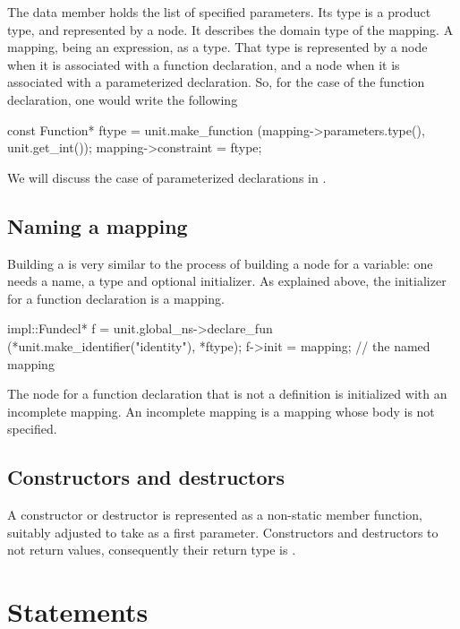 \documentclass[a4paper,12pt]{article}
\begin{document}
The data member 
holds the list of specified parameters.  Its type is a product type, and
represented by a  node.  It describes the domain type of
the mapping.  A mapping, being an expression, as a type.  That type is
represented by a  node when it is associated with a
function declaration, and a  node when it is associated
with a parameterized declaration.  So, for the case of the 
function declaration, one would write the following
\begin{Program}
const Function* ftype = unit.make_function
    (mapping->parameters.type(), unit.get_int());
mapping->constraint = ftype;  
\end{Program}

We will discuss the case of parameterized declarations in
. 

\subsection{Naming a mapping}
\label{sec:fun-decl:naming}

Building a  is very similar to the process of
building a node for a variable: one needs a name, a type and optional
initializer.  As explained above, the initializer for a function declaration
is a mapping.
\begin{Program}
impl::Fundecl* f = unit.global_ns->declare_fun
   (*unit.make_identifier("identity"), *ftype);
f->init = mapping;                        // the named mapping
\end{Program}

The node for a function declaration that is not a definition is initialized
with an incomplete mapping.   An incomplete mapping is a mapping whose body is
not specified.


\subsection{Constructors and destructors}

A constructor or destructor is represented as a non-static member function,
suitably adjusted to take  as a first parameter.  Constructors and
destructors to not return values, consequently their return type is
.

\section{Statements}
\label{sec:statements}
\end{document}
